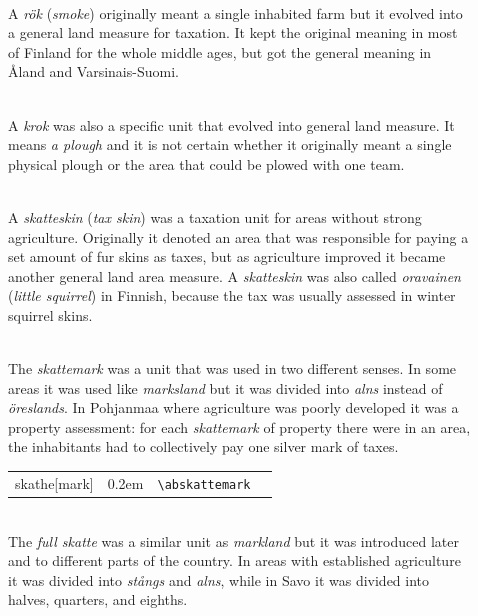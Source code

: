 \documentclass[a4paper]{article}
\newcommand{\samplefont}{\fontsize{16}{16}\abcursivefamily\spaceskip0.2em}
\newcommand{\sample}[1]{{\samplefont #1 \strut}}
\newcommand{\ltxncmd}[1]{\texttt{\textbackslash{}#1}}
\begin{document}
\begin{description}
\item [\sample{rök}, \emph{rök}, \emph{savu}] \mbox{} \\
  A \emph{rök} (\emph{smoke}) originally meant a single inhabited farm
  but it evolved into a general land measure for taxation. It kept the
  original meaning in most of Finland for the whole middle ages, but
  got the general meaning in Åland and Varsinais-Suomi.


\item [\sample{krok}, \emph{krok}, \emph{aura}] \mbox{} \\
  A \emph{krok} was also a specific unit that evolved into general
  land measure. It means \emph{a plough} and it is not certain whether
  it originally meant a single physical plough or the area that could
  be plowed with one team.


\item [\sample{skatheskin}, \emph{skatteskin}, \emph{veronahka}, \emph{oravainen}] \mbox{} \\
  A \emph{skatteskin} (\emph{tax skin}) was a taxation unit for areas
  without strong agriculture. Originally it denoted an area that was
  responsible for paying a set amount of fur skins as taxes, but as
  agriculture improved it became another general land area measure. A
  \emph{skatteskin} was also called \emph{oravainen} (\emph{little
    squirrel}) in Finnish, because the tax was usually assessed in
  winter squirrel skins.


\item [\sample{\abskattemark} \emph{skattemark},
  \emph{veromarkka},] \mbox{} \\
  The \emph{skattemark} was a unit that was used in two different
  senses. In some areas it was used like \emph{marksland} but it was
  divided into \emph{alns} instead of \emph{öreslands}. In Pohjanmaa
  where agriculture was poorly developed it was a property assessment:
  for each \emph{skattemark} of property there were in an area, the
  inhabitants had to collectively pay one silver mark of taxes.
  \begin{center}
    \begin{tabular}{llll}
      {}skathe[mark] & \sample{\abskattemark} & \ltxncmd{abskattemark} \\
    \end{tabular}
  \end{center}




\item [\sample{full skathe}, \emph{full skatte}, \emph{täysvero}] \mbox{} \\
  The \emph{full skatte} was a similar unit as \emph{markland} but it
  was introduced later and to different parts of the country. In areas
  with established agriculture it was divided into \emph{stångs} and
  \emph{alns}, while in Savo it was divided into halves, quarters, and
  eighths.


\end{description}
\end{document}
